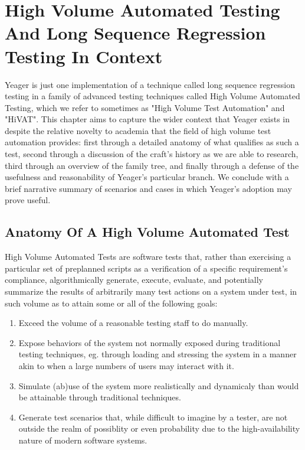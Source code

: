 \chapter{High Volume Automated Testing And Long Sequence Regression Testing In Context}
Yeager is just one implementation of a technique called long sequence regression testing in a family of advanced testing techniques called High Volume Automated Testing, which we refer to sometimes as "High Volume Test Automation" and "HiVAT". This chapter aims to capture the wider context that Yeager exists in despite the relative novelty to academia that the field of high volume test automation provides: first through a detailed anatomy of what qualifies as such a test, second through a discussion of the craft's history as we are able to research, third through an overview of the family tree, and finally through a defense of the usefulness and reasonability of Yeager's particular branch. We conclude with a brief narrative summary of scenarios and cases in which Yeager's adoption may prove useful.

\section{Anatomy Of A High Volume Automated Test}
High Volume Automated Tests are software tests that, rather than exercising a particular set of preplanned scripts as a verification of a specific requirement's compliance, algorithmically generate, execute, evaluate, and potentially summarize the results of arbitrarily many test actions on a system under test, in such volume as to attain some or all of the following goals:
\begin{enumerate}
\item Exceed the volume of a reasonable testing staff to do manually.
\item Expose behaviors of the system not normally exposed during traditional testing techniques, eg. through loading and stressing the system in a manner akin to when a large numbers of users may interact with it.
\item Simulate (ab)use of the system more realistically and dynamicaly than would be attainable through traditional techniques.
\item Generate test scenarios that, while difficult to imagine by a tester, are not outside the realm of possiblity or even probability due to the high-availability nature of modern software systems.
\end{enumerate}

